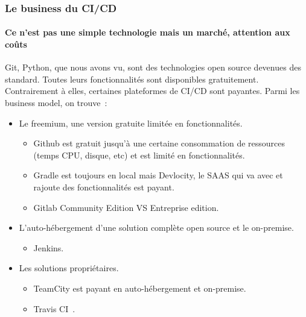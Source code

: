 \documentclass{beamer}
\begin{document}
    \begin{frame}
        \frametitle{Le business du CI/CD}
        \framesubtitle{Ce n'est pas une simple technologie mais un marché, attention aux coûts}
        \transdissolve
        Git, Python, que nous avons vu, sont des technologies open source devenues des standard.
        Toutes leurs fonctionnalités sont disponibles gratuitement.
        Contrairement à elles, certaines plateformes de CI/CD sont payantes.
        \bigbreak
        Parmi les business model, on trouve~:
        \begin{itemize}
            \item Le freemium, une version gratuite limitée en fonctionnalités.
            \begin{itemize}
                \item Github est gratuit jusqu'à une certaine consommation de ressources (temps CPU, disque, etc) et est limité en fonctionnalités.
                \item Gradle est toujours  en local mais Devlocity, le SAAS qui va avec et rajoute des fonctionnalités est payant.
                \item Gitlab Community Edition VS Entreprise edition.
            \end{itemize}
            \item L'auto-hébergement d'une solution complète open source et le on-premise.
            \begin{itemize}
                \item Jenkins.
            \end{itemize}
            \item Les solutions propriétaires.
            \begin{itemize}
                \item TeamCity est payant en auto-hébergement et on-premise.
                \item Travis CI~.
            \end{itemize}
        \end{itemize}
    \end{frame}
\end{document}
